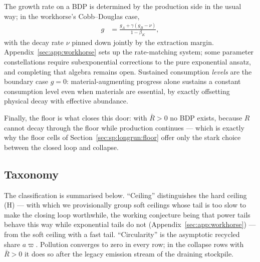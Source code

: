The growth rate on a BDP is determined by the production side in the usual way; in the workhorse's Cobb--Douglas case,
\begin{align}
g &= \frac{g_A+\gamma\left(g_B-\nu\right)}{1-\beta_K},
\label{eq:sp:lr:bdp-growth}
\end{align}
with the decay rate $\nu$ pinned down jointly by the extraction margin. Appendix~\ref{sec:app:workhorse} sets up the rate-matching system; some parameter constellations require subexponential corrections to the pure exponential ansatz, and completing that algebra remains open. Sustained consumption \emph{levels} are the boundary case $g=0$: material-augmenting progress alone sustains a constant consumption level even when materials are essential, by exactly offsetting physical decay with effective abundance.

Finally, the floor is what closes this door: with $\bar R>0$ no BDP exists, because $R$ cannot decay through the floor while production continues --- which is exactly why the floor cells of Section~\ref{sec:sp:longrun:floor} offer only the stark choice between the closed loop and collapse.

\subsection{Taxonomy}\label{sec:sp:longrun:taxonomy}

The classification is summarised below. ``Ceiling'' distinguishes the hard ceiling (H) --- with which we provisionally group soft ceilings whose tail is too slow to make the closing loop worthwhile, the working conjecture being that power tails behave this way while exponential tails do not (Appendix~\ref{sec:app:workhorse}) --- from the soft ceiling with a fast tail. ``Circularity'' is the asymptotic recycled share $a\varpi$. Pollution converges to zero in every row; in the collapse rows with $\bar R>0$ it does so after the legacy emission stream of the draining stockpile.


